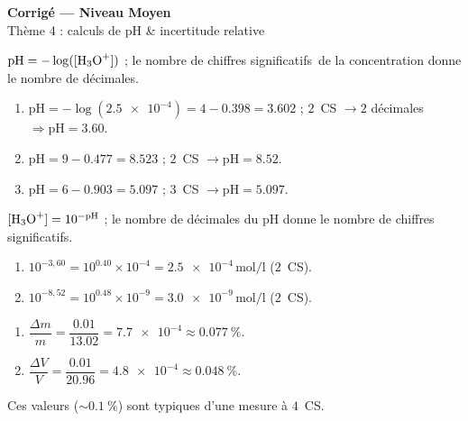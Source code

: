 \documentclass[11pt,a4paper]{article}
\newcommand{\CS}{chiffres significatifs}
\begin{document}
\begin{center}
{\Large\bfseries\color{primarydark} Corrigé — Niveau Moyen}\\[1pt]
{\color{primary} Thème 4 : calculs de pH \& incertitude relative}
\end{center}
\vspace{2mm}

\begin{cor}
$\mathrm{pH}=-\log([\ce{H3O+}])$ ; le nombre de \CS\ de la concentration donne le nombre de décimales.
\begin{enumerate}[label=\alph*),leftmargin=1.6em,itemsep=1pt]
  \item $\mathrm{pH}=-\log(\num{2,5e-4})=4-\num{0,398}=\num{3,602}$ ; $2$~CS $\to 2$ décimales
        $\Rightarrow \boxed{\mathrm{pH}=\num{3,60}}$.
  \item $\mathrm{pH}=9-\num{0,477}=\num{8,523}$ ; $2$~CS $\to \boxed{\mathrm{pH}=\num{8,52}}$.
  \item $\mathrm{pH}=6-\num{0,903}=\num{5,097}$ ; $3$~CS $\to \boxed{\mathrm{pH}=\num{5,097}}$.
\end{enumerate}
\end{cor}

\begin{cor}
$[\ce{H3O+}]=10^{-\mathrm{pH}}$ ; le nombre de décimales du pH donne le nombre de \CS.
\begin{enumerate}[label=\alph*),leftmargin=1.6em,itemsep=1pt]
  \item $10^{-3,60}=10^{\num{0,40}}\times10^{-4}=\boxed{\num{2,5e-4}\,\si{\mol\per\litre}}$ ($2$~CS).
  \item $10^{-8,52}=10^{\num{0,48}}\times10^{-9}=\boxed{\num{3,0e-9}\,\si{\mol\per\litre}}$ ($2$~CS).
\end{enumerate}
\end{cor}

\begin{cor}
\begin{enumerate}[label=\alph*),leftmargin=1.6em,itemsep=1pt]
  \item $\dfrac{\Delta m}{m}=\dfrac{\num{0,01}}{\num{13,02}}=\num{7,7e-4}\approx\qty{0,077}{\percent}$.
  \item $\dfrac{\Delta V}{V}=\dfrac{\num{0,01}}{\num{20,96}}=\num{4,8e-4}\approx\qty{0,048}{\percent}$.
\end{enumerate}
Ces valeurs ($\sim\qty{0,1}{\percent}$) sont typiques d'une mesure à $4$~CS.
\end{cor}
\end{document}
